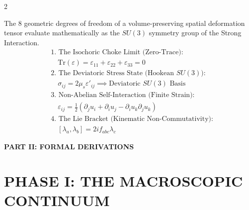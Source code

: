 \begin{multicols}{2}
\begin{tcolorbox}[cheatbox, title={\refstepcounter{cheatnum}\label{box:hookes_su3}\thecheatnum. Generalized Hooke's Law \& $SU(3)$ \hfill\makebox[0pt][r]{\scriptsize\hyperref[sec:deriv_hookes_su3]{[Proof $\downarrow$]}}}]
The 8 geometric degrees of freedom of a volume-preserving spatial deformation tensor evaluate mathematically as the $SU(3)$ symmetry group of the Strong Interaction.
\begin{align}
    &\text{1. The Isochoric Choke Limit (Zero-Trace):} \nonumber \\
    &\quad \text{Tr}(\varepsilon) = \varepsilon_{11} + \varepsilon_{22} + \varepsilon_{33} = 0 \label{eq:isochoric_trace} \\
    &\text{2. The Deviatoric Stress State (Hookean $SU(3)$):} \nonumber \\
    &\quad \sigma_{ij} = 2\mu_s \varepsilon'_{ij} \implies \text{Deviatoric } SU(3) \text{ Basis} \label{eq:deviatoric_stress} \\
    &\text{3. Non-Abelian Self-Interaction (Finite Strain):} \nonumber \\
    &\quad \varepsilon_{ij} = \frac{1}{2} \left( \partial_j u_i + \partial_i u_j - \partial_i u_k \partial_j u_k \right) \label{eq:su3_finite_strain} \\
    &\text{4. The Lie Bracket (Kinematic Non-Commutativity):} \nonumber \\
    &\quad [\lambda_a, \lambda_b] = 2i f_{abc} \lambda_c \label{eq:non_abelian_commutator}
\end{align}
\end{tcolorbox}

\end{multicols}

\newpage
\begin{center}
    \LARGE\textbf{PART II: FORMAL DERIVATIONS}
    \label{sec:part2}
\end{center}
\vspace{0.4cm}


\part*{PHASE I: THE MACROSCOPIC CONTINUUM}


